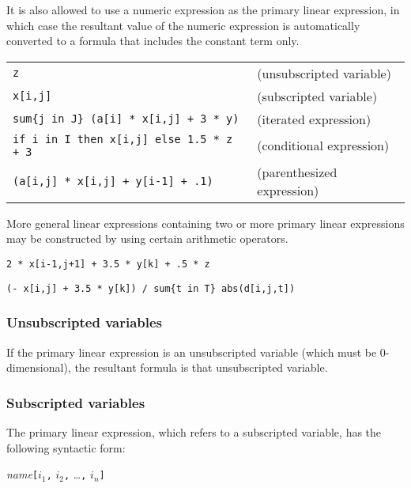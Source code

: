 \documentclass[10pt]{article}
\begin{document}
It is also allowed to use a numeric expression as the primary linear
expression, in which case the resultant value of the numeric expression
is automatically converted to a formula that includes the constant term
only.

\medskip


\medskip

\noindent
\begin{tabular}{@{}ll@{}}
\verb|z|&(unsubscripted variable)\\
\verb|x[i,j]|&(subscripted variable)\\
\verb|sum{j in J} (a[i] * x[i,j] + 3 * y)|&(iterated expression)\\
\verb|if i in I then x[i,j] else 1.5 * z + 3|&(conditional expression)\\
\verb|(a[i,j] * x[i,j] + y[i-1] + .1)|&(parenthesized expression)\\
\end{tabular}

\medskip

More general linear expressions containing two or more primary linear
expressions may be constructed by using certain arithmetic operators.

\medskip


\medskip

\noindent\verb|2 * x[i-1,j+1] + 3.5 * y[k] + .5 * z|

\noindent\verb|(- x[i,j] + 3.5 * y[k]) / sum{t in T} abs(d[i,j,t])|

\subsubsection{Unsubscripted variables}

If the primary linear expression is an unsubscripted variable (which
must be 0-dimensional), the resultant formula is that unsubscripted
variable.

\subsubsection{Subscripted variables}

The primary linear expression, which refers to a subscripted variable,
has the following syntactic form:

\medskip

\noindent\hfil
{\it name}{\tt[}$i_1${\tt,} $i_2${\tt,} \dots{\tt,} $i_n${\tt]}
\end{document}
